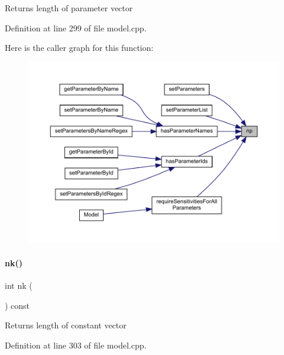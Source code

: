 \begin{DoxyReturn}{Returns}
length of parameter vector 
\end{DoxyReturn}


Definition at line 299 of file model.\+cpp.

Here is the caller graph for this function\+:
\nopagebreak
\begin{figure}[H]
\begin{center}
\leavevmode
\includegraphics[width=350pt]{classamici_1_1_model_ae296546c9fd4d7c4ad3b7000aa9e22ef_icgraph}
\end{center}
\end{figure}
\mbox{\label{classamici_1_1_model_a3d4130da64883565a06a86e7d6029da1}} 
\paragraph{\texorpdfstring{nk()}{nk()}}
{\footnotesize\ttfamily int nk (\begin{DoxyParamCaption}{ }\end{DoxyParamCaption}) const}

\begin{DoxyReturn}{Returns}
length of constant vector 
\end{DoxyReturn}


Definition at line 303 of file model.\+cpp.


